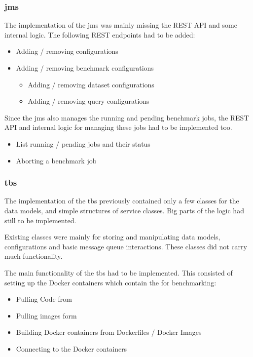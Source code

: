 \subsubsection{\acl{jms}}
The implementation of the \acl{jms} was mainly missing the REST API and some internal logic.
The following REST endpoints had to be added:

\begin{itemize}
	\item Adding / removing \ts{} configurations
	
	\item Adding / removing benchmark configurations
		\begin{itemize}
			\item Adding / removing dataset configurations
			
			\item Adding / removing query configurations
		\end{itemize}
\end{itemize}

Since the \ac{jms} also manages the running and pending benchmark jobs, the REST API and internal logic for managing these jobs had to be implemented too.

\begin{itemize}
	\item List running / pending jobs and their status
	
	\item Aborting a benchmark job
\end{itemize}



\subsubsection{\acl{tbs}}
The implementation of the \acl{tbs} previously contained only a few classes for the data models, and simple structures of service classes.
Big parts of the logic had still to be implemented.

Existing classes were mainly for storing and manipulating data models, configurations and basic message queue interactions.
These classes did not carry much functionality.

The main functionality of the \ac{tbs} had to be implemented.
This consisted of setting up the Docker containers which contain the \tsp{} for benchmarking:

\begin{itemize}
	\item Pulling Code from \gh{}
	\item Pulling images form \dockh{}
	
	\item Building Docker containers from Dockerfiles / Docker Images
	
	\item Connecting to the Docker containers
\end{itemize}

